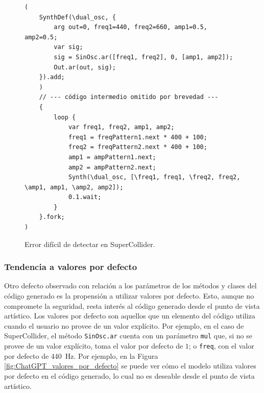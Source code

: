 \begin{figure}[H]
    \caption[Error difícil de detectar en SuperCollider]{Error difícil de detectar en SuperCollider.}
    \centering
    \begin{lstlisting}[style=SuperCollider-IDE, basicstyle=\footnotesize\ttfamily, numbers=none]
(
    SynthDef(\dual_osc, {
        arg out=0, freq1=440, freq2=660, amp1=0.5, amp2=0.5;
        var sig;
        sig = SinOsc.ar([freq1, freq2], 0, [amp1, amp2]);
        Out.ar(out, sig);
    }).add;
    )
    // --- código intermedio omitido por brevedad ---
    {
        loop {
            var freq1, freq2, amp1, amp2;
            freq1 = freqPattern1.next * 400 + 100;
            freq2 = freqPattern2.next * 400 + 100;
            amp1 = ampPattern1.next;
            amp2 = ampPattern2.next;
            Synth(\dual_osc, [\freq1, freq1, \freq2, freq2, \amp1, amp1, \amp2, amp2]);
            0.1.wait;
        }
    }.fork;
)
    \end{lstlisting}
    \source{\propio}
    \label{fig:error_dificil_detectar_supercollider}
\end{figure}

\subsubsection{Tendencia a valores {por defecto}}
Otro defecto observado con relación a los parámetros de los métodos y clases del código generado es la propensión a utilizar valores por defecto. Esto, aunque no compromete la seguridad, resta interés al código generado desde el punto de vista artístico. Los valores por defecto son aquellos que un elemento del código utiliza cuando el usuario no provee de un valor explícito. Por ejemplo, en el caso de SuperCollider, el método \texttt{SinOsc.ar} cuenta con un parámetro \texttt{mul} que, si no se provee de un valor explícito, toma el valor por defecto de $1$; o \texttt{freq}, con el valor por defecto de \SI{440}{\hertz}. Por ejemplo, en la Figura \ref{fig:ChatGPT_valores_por_defecto} se puede ver cómo el modelo utiliza valores por defecto en el código generado, lo cual no es deseable desde el punto de vista artístico.

